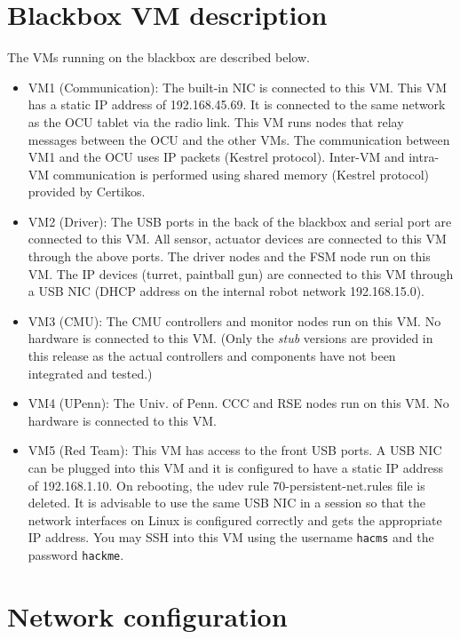 \section{Blackbox VM description}
The VMs running on the blackbox are described below.
\begin{itemize}
  \item VM1 (Communication): The built-in NIC is connected to this VM. This VM has a static IP
    address of {192.168.45.69}. It is connected to the same network as the OCU tablet via the radio link.
    This VM runs nodes that relay messages between the OCU and the other VMs. The communication
    between VM1 and the OCU uses IP packets (Kestrel protocol). Inter-VM and intra-VM communication 
    is performed using shared memory (Kestrel protocol) provided by Certikos.
  \item VM2 (Driver): The USB ports in the back of the blackbox and serial port are
    connected to this VM. All sensor, actuator devices are connected to this VM through the 
    above ports. The driver
    nodes and the FSM node run on this VM. The IP devices (turret, paintball gun) are
    connected to this VM through a USB NIC (DHCP address on the internal robot network
    {192.168.15.0}). 
  
  \item VM3 (CMU): The CMU controllers and monitor nodes run on this VM. No hardware is
    connected to this VM. (Only the \emph{stub} versions are provided in this release as the
    actual controllers and components have not been integrated and tested.)
  \item VM4 (UPenn): The Univ. of Penn. CCC and RSE nodes run on this VM. No hardware is
    connected to this VM.
  \item VM5 (Red Team): This VM has access to the front USB ports. A USB NIC can be plugged
    into this VM and it is configured to have a static IP address of {192.168.1.10}. On
    rebooting, the udev rule 70-persistent-net.rules file is deleted. It is
    advisable to use the same USB NIC in a session so that the network interfaces on Linux is
    configured correctly and gets the appropriate IP address. You may SSH into this VM using the
    username \texttt{hacms} and the password \texttt{hackme}.
\end{itemize}


\section{Network configuration}

